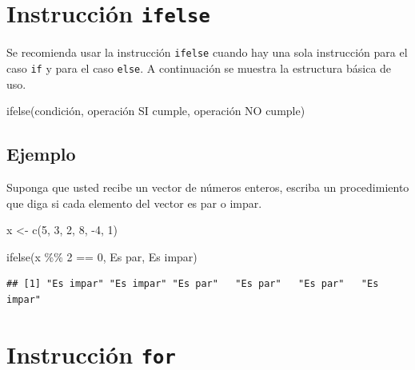 \documentclass[
]{book}
\makeatletter
\newenvironment{Shaded}{\begin{snugshade}}{\end{snugshade}}
\newcommand{\DecValTok}[1]{\textcolor[rgb]{0.00,0.00,0.81}{#1}}
\newcommand{\FunctionTok}[1]{\textcolor[rgb]{0.00,0.00,0.00}{#1}}
\newcommand{\NormalTok}[1]{#1}
\newcommand{\OtherTok}[1]{\textcolor[rgb]{0.56,0.35,0.01}{#1}}
\newcommand{\SpecialCharTok}[1]{\textcolor[rgb]{0.00,0.00,0.00}{#1}}
\newcommand{\StringTok}[1]{\textcolor[rgb]{0.31,0.60,0.02}{#1}}
\newenvironment{kframe}{%
\medskip{}
\setlength{\fboxsep}{.8em}
 \def\at@end@of@kframe{}%
 \ifinner\ifhmode%
  \def\at@end@of@kframe{\end{minipage}}%
  \begin{minipage}{\columnwidth}%
 \fi\fi%
 \def\FrameCommand##1{\hskip\@totalleftmargin \hskip-\fboxsep
 \colorbox{shadecolor}{##1}\hskip-\fboxsep
     \hskip-\linewidth \hskip-\@totalleftmargin \hskip\columnwidth}%
 \MakeFramed {\advance\hsize-\width
   \@totalleftmargin\z@ \linewidth\hsize
   \@setminipage}}%
 {\par\unskip\endMakeFramed%
 \at@end@of@kframe}
\renewenvironment{Shaded}{\begin{kframe}}{\end{kframe}}
\makeatother
\begin{document}
\hypertarget{instrucciuxf3n-ifelse}{%
\section{\texorpdfstring{Instrucción \texttt{ifelse}}{Instrucción ifelse}}\label{instrucciuxf3n-ifelse}}

Se recomienda usar la instrucción \texttt{ifelse} cuando hay una sola instrucción para el caso \texttt{if} y para el caso \texttt{else}. A continuación se muestra la estructura básica de uso.

\begin{Shaded}
\begin{Highlighting}[]
\FunctionTok{ifelse}\NormalTok{(condición, operación SI cumple, operación NO cumple)}
\end{Highlighting}
\end{Shaded}

\hypertarget{ejemplo-16}{%
\subsection*{Ejemplo}\label{ejemplo-16}}

Suponga que usted recibe un vector de números enteros, escriba un procedimiento que diga si cada elemento del vector es par o impar.

\begin{Shaded}
\begin{Highlighting}[]
\NormalTok{x }\OtherTok{\textless{}{-}} \FunctionTok{c}\NormalTok{(}\DecValTok{5}\NormalTok{, }\DecValTok{3}\NormalTok{, }\DecValTok{2}\NormalTok{, }\DecValTok{8}\NormalTok{, }\SpecialCharTok{{-}}\DecValTok{4}\NormalTok{, }\DecValTok{1}\NormalTok{)}

\FunctionTok{ifelse}\NormalTok{(x }\SpecialCharTok{\%\%} \DecValTok{2} \SpecialCharTok{==} \DecValTok{0}\NormalTok{, }\StringTok{\textquotesingle{}Es par\textquotesingle{}}\NormalTok{, }\StringTok{\textquotesingle{}Es impar\textquotesingle{}}\NormalTok{)}
\end{Highlighting}
\end{Shaded}

\begin{verbatim}
## [1] "Es impar" "Es impar" "Es par"   "Es par"   "Es par"   "Es impar"
\end{verbatim}

\hypertarget{instrucciuxf3n-for}{%
\section{\texorpdfstring{Instrucción \texttt{for}}{Instrucción for}}\label{instrucciuxf3n-for}}
\end{document}
